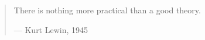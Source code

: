 \cleardoublepage
\thispagestyle{empty}

\vspace*{3cm}

\begin{quotation}
  There is nothing more practical than a good theory.%
\begin{flushright}
    --- Kurt Lewin, 1945 
\end{flushright}
\end{quotation}
